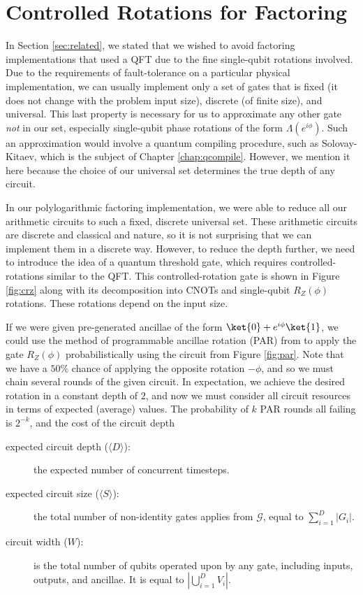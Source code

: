 \section{Controlled Rotations for Factoring}
\label{sec:factor-crz}

In Section \ref{sec:related}, we stated that we wished to avoid
factoring implementations that used a QFT due to the fine
single-qubit rotations involved. Due to the requirements of
fault-tolerance on a particular physical implementation,
we can usually implement only a set of gates that is fixed
(it does not change with the problem input size), discrete (of finite size),
and universal. This last property is necessary for us to approximate any
other gate \emph{not} in our set, especially single-qubit phase rotations
of the form $\Lambda(e^{i \phi})$. Such an approximation would involve
a quantum compiling procedure, such as Solovay-Kitaev, which is the
subject of Chapter \ref{chap:qcompile}. However, we mention it here
because the choice of our universal set determines the true depth
of any circuit.

In our polylogarithmic factoring implementation, we were able to reduce
all our arithmetic circuits to such a fixed, discrete universal set.
These arithmetic circuits are discrete and classical and nature, so it is
not surprising that we can implement them in a discrete way.
However, to reduce the depth further, we need to introduce the idea of
a quantum threshold gate, which requires controlled-rotations similar to
the QFT. This controlled-rotation gate is shown in Figure \ref{fig:crz}
along with its decomposition into CNOTs and single-qubit $R_Z(\phi)$
rotations.
These rotations depend on the input size.

If we were given pre-generated ancillae of the form
$\ket{0} + e^{i\phi}\ket{1}$, we could use the method of programmable ancillae rotation (PAR) from
\cite{Jones2012}
to apply the gate $R_Z(\phi)$ probabilistically
using the circuit from Figure \ref{fig:par}. Note that we have a $50\%$
chance
of applying the opposite rotation $-\phi$, and so we must chain
several rounds of the given circuit. In expectation, we achieve the
desired rotation in a constant depth of $2$, and now we must consider
all circuit resources in terms of expected (average) values. The 
probability of $k$ PAR rounds all failing is $2^{-k}$, and the cost
of the circuit depth 

\begin{description}
\item[expected circuit depth ($\langle D \rangle $):] the expected number of concurrent timesteps.
\item[expected circuit size ($\langle S \rangle$):] the total number of non-identity gates applies
from $\mathcal{G}$, equal to $\sum_{i=1}^D |G_i|$.
\item[circuit width ($W$):] is the total number of qubits operated upon by
any gate, including inputs, outputs, and ancillae. It is equal to $| \bigcup_{i=1}^D V_i|$.

\end{description}

